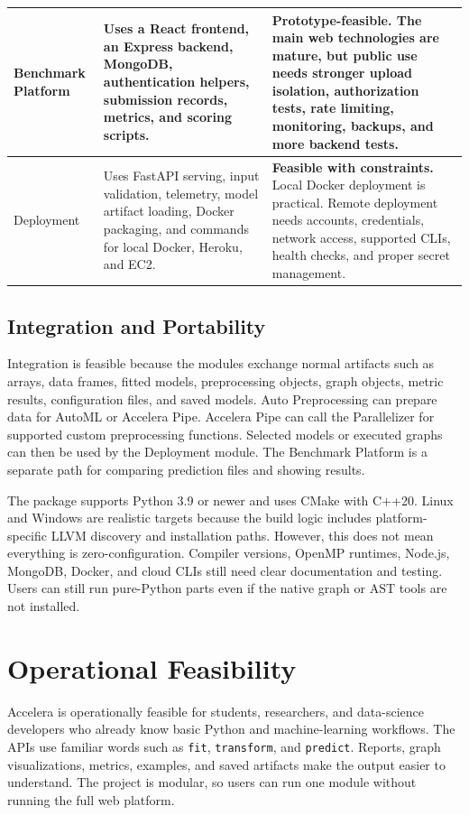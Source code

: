 \documentclass[12pt,a4paper]{report}
\begin{document}
{\begin{longtable}{p{} p{} p{}}
Benchmark Platform & Uses a React frontend, an Express backend, MongoDB,
authentication helpers, submission records, metrics, and scoring scripts. &
\textbf{Prototype-feasible.} The main web technologies are mature, but public use
needs stronger upload isolation, authorization tests, rate limiting, monitoring,
backups, and more backend tests. \\
\hline

Deployment & Uses FastAPI serving, input validation, telemetry, model artifact
loading, Docker packaging, and commands for local Docker, Heroku, and EC2. &
\textbf{Feasible with constraints.} Local Docker deployment is practical. Remote
deployment needs accounts, credentials, network access, supported CLIs, health
checks, and proper secret management. \\
\hline

\end{longtable}
}


\subsection{Integration and Portability}
Integration is feasible because the modules exchange normal artifacts such as
arrays, data frames, fitted models, preprocessing objects, graph objects, metric
results, configuration files, and saved models. Auto Preprocessing can prepare
data for AutoML or Accelera Pipe. Accelera Pipe can call the Parallelizer for
supported custom preprocessing functions. Selected models or executed graphs can
then be used by the Deployment module. The Benchmark Platform is a separate path
for comparing prediction files and showing results.

The package supports Python 3.9 or newer and uses CMake with C++20. Linux and
Windows are realistic targets because the build logic includes platform-specific
LLVM discovery and installation paths. However, this does not mean everything is
zero-configuration. Compiler versions, OpenMP runtimes, Node.js, MongoDB,
Docker, and cloud CLIs still need clear documentation and testing. Users can
still run pure-Python parts even if the native graph or AST tools are not
installed.

\section{Operational Feasibility}
Accelera is operationally feasible for students, researchers, and data-science
developers who already know basic Python and machine-learning workflows. The
APIs use familiar words such as \texttt{fit}, \texttt{transform}, and
\texttt{predict}. Reports, graph visualizations, metrics, examples, and saved
artifacts make the output easier to understand. The project is modular, so users
can run one module without running the full web platform.
\end{document}
